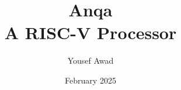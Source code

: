 

\documentclass{article}
\usepackage{graphicx} %
\usepackage{varwidth}
\usepackage{xcolor}
\usepackage{listings}


\title{Anqa \\ \small A RISC-V Processor}
\author{Yousef Awad}
\date{February 2025}
\setcounter{secnumdepth}{0}



\maketitle

\section{Opening Words}
\qquad
The objective of this processor is to implement the basic 40 instruction ISA (of which 36 are explained below) of RISC-V RV32I of which is explained in my own words, as well as explain how I went about doing it myself. I plan to make the actual processor in Vivado 2024.2 using the Verilog language.
\newpage



